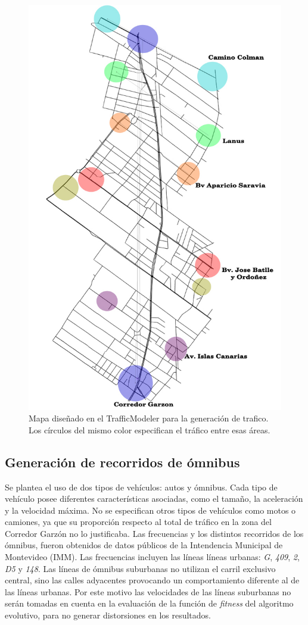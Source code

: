 \begin{figure}[ht]
	\centering
	\includegraphics[width=0.5\linewidth]{Figures/areaflow1}
	\caption[Mapa diseñado en el TrafficModeler para la generación de tráfico.]{Mapa diseñado en el TrafficModeler para la generación de trafico. Los círculos del mismo color especifican el tráfico entre esas áreas. }
	\label{fig:areaflow1}
\end{figure}

\subsection{Generación de recorridos de ómnibus}

Se plantea el uso de dos tipos de vehículos: autos y ómnibus. Cada tipo de vehículo posee diferentes características asociadas, como el tamaño, la aceleración y la velocidad máxima. No se especifican otros tipos de vehículos como motos o camiones, ya que su proporción respecto al total de tráfico en la zona del Corredor Garzón no lo justificaba. Las frecuencias y los distintos recorridos de los ómnibus, fueron obtenidos de datos públicos de la Intendencia Municipal de Montevideo (IMM). Las frecuencias incluyen las líneas líneas urbanas: \textit{G}, \textit{409}, \textit{2}, \textit{D5} y \textit{148}. Las líneas de ómnibus suburbanas no utilizan el carril exclusivo central, sino las calles adyacentes provocando un comportamiento diferente al de las líneas urbanas. Por este motivo las velocidades de las líneas suburbanas no serán tomadas en cuenta en la evaluación de la función de \emph{fitness} del algoritmo evolutivo, para no generar distorsiones en los resultados.

